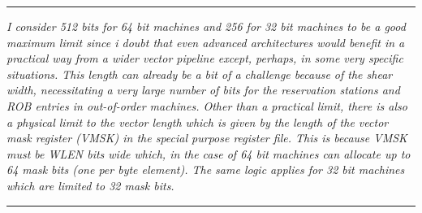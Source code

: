     \par\noindent\rule{\textwidth}{0.4pt}
    \textit{I consider 512 bits for 64 bit machines and 256 for 32 bit machines to be a good maximum limit since i doubt that even advanced architectures would benefit in a practical way from a wider vector pipeline except, perhaps, in some very specific situations. This length can already be a bit of a challenge because of the shear width, necessitating a very large number of bits for the reservation stations and ROB entries in out-of-order machines. Other than a practical limit, there is also a physical limit to the vector length which is given by the length of the vector mask register (VMSK) in the special purpose register file. This is because VMSK must be WLEN bits wide which, in the case of 64 bit machines can allocate up to 64 mask bits (one per byte element). The same logic applies for 32 bit machines which are limited to 32 mask bits.}
    \par\noindent\rule{\textwidth}{0.4pt}